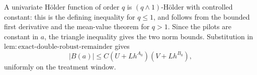 A univariate Hölder function of order \(q\) is \((q\wedge1)\)-Hölder with controlled constant: this is the defining inequality for \(q\le1\), and follows from the bounded first derivative and the mean-value theorem for \(q>1\). Since the pilots are constant in \(a\), the triangle inequality gives the two norm bounds. Substitution in \(\mathrm{lem:exact\text{-}double\text{-}robust\text{-}remainder}\) gives
\[
\lvert B(a)\rvert\le C(U+Lh^{A_0})(V+Lh^{B_0}),
\]
uniformly on the treatment window.